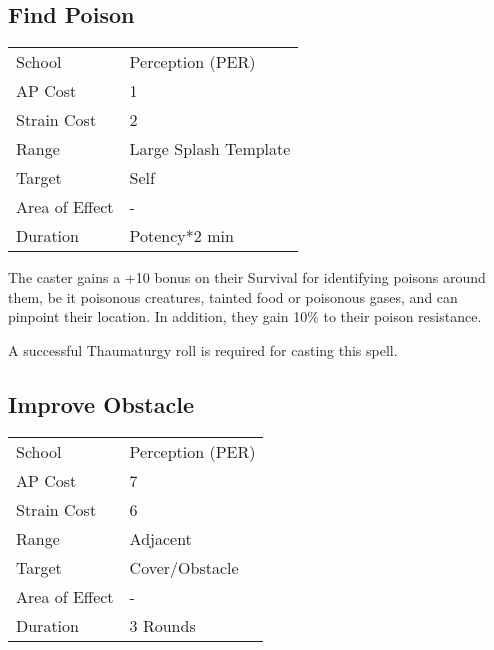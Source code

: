 \documentclass[11pt,a4paper,twocolumn]{book}
\begin{document}

\subsection*{Find Poison}
{
	\begin{tabu} to 75mm{| X[l,4] | X[l,7] |}
		\hline
		School 			& Perception (PER) 	\\
		AP Cost	      	& 1 				\\
		Strain Cost     & 2 				\\
		Range     		& Large Splash Template 	\\
		Target      	& Self 				\\
		Area of Effect  & - 	 			\\
		Duration     	& Potency*2 min 		\\ \hline
	\end{tabu}
	
}

\medskip

The caster gains a +10 bonus on their Survival for identifying poisons around them, be it poisonous creatures, tainted food or poisonous gases, and can pinpoint their location. In addition, they gain 10\% to their poison resistance.

A successful Thaumaturgy roll is required for casting this spell.



\subsection*{Improve Obstacle}
{
	\begin{tabu} to 75mm{| X[l,4] | X[l,7] |}
		\hline
		School 			& Perception (PER) 	\\
		AP Cost	      	& 7 				\\
		Strain Cost     & 6 				\\
		Range     		& Adjacent 			\\
		Target      	& Cover/Obstacle 	\\
		Area of Effect  & - 	 			\\
		Duration     	& 3 Rounds 	\\ \hline
	\end{tabu}
	
}

\medskip
\end{document}
